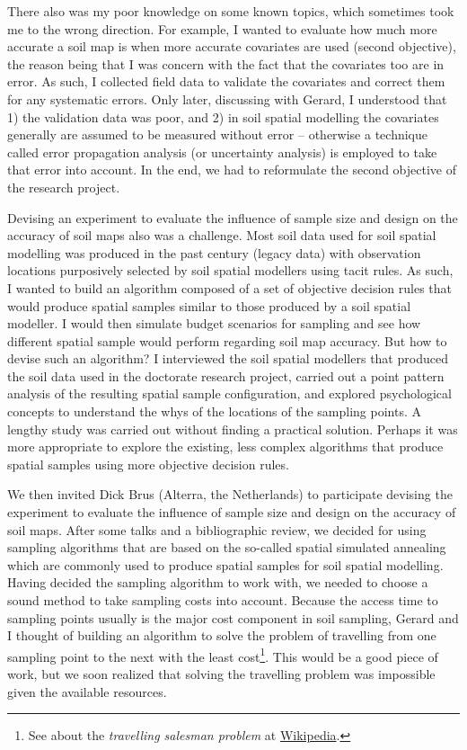 There also was my poor knowledge on some known topics, which sometimes took me to the wrong direction. For 
example, I wanted to evaluate how much more accurate a soil map is when more accurate covariates are used 
(second objective), the reason being that I was concern with the fact that the covariates too are in error. As 
such, I collected field data to validate the covariates and correct them for any systematic errors. Only later, 
discussing with Gerard, I understood that 1) the validation data was poor, and 2) in soil spatial modelling the 
covariates generally are assumed to be measured without error -- otherwise a technique called error propagation 
analysis (or uncertainty analysis) is employed to take that error into account. In the end, we had to 
reformulate the second objective of the research project.

Devising an experiment to evaluate the influence of sample size and design on the accuracy of soil maps also 
was a challenge. Most soil data used for soil spatial modelling was produced in the past century (legacy data) 
with observation locations purposively selected by soil spatial modellers using tacit rules. As such, I wanted 
to build an algorithm composed of a set of objective decision rules that would produce spatial samples similar 
to those produced by a soil spatial modeller. I would then simulate budget scenarios for sampling and see how 
different spatial sample would perform regarding soil map accuracy. But how to devise such an algorithm? I 
interviewed the soil spatial modellers that produced the soil data used in the doctorate research project, 
carried out a point pattern analysis of the resulting spatial sample configuration, and explored psychological 
concepts to understand the whys of the locations of the sampling points. A lengthy study was carried out 
without finding a practical solution. Perhaps it was more appropriate to explore the existing, less complex 
algorithms that produce spatial samples using more objective decision rules.

\def\foottravel{See about the \emph{travelling salesman problem} at 
\href{https://en.wikipedia.org/wiki/Travelling_salesman_problem}{Wikipedia}.}

We then invited Dick Brus (Alterra, the Netherlands) to participate devising the experiment to evaluate the 
influence of sample size and design on the accuracy of soil maps. After some talks and a bibliographic review, 
we decided for using sampling algorithms that are based on the so-called spatial simulated annealing which are 
commonly used to produce spatial samples for soil spatial modelling. Having decided the sampling algorithm to 
work with, we needed to choose a sound method to take sampling costs into account. Because the access time to 
sampling points usually is the major cost component in soil sampling, Gerard and I thought of building an 
algorithm to solve the problem of travelling from one sampling point to the next with the least 
cost\footnote{\foottravel}. This would be a good piece of work, but we soon realized that solving the 
travelling problem was impossible given the available resources.

